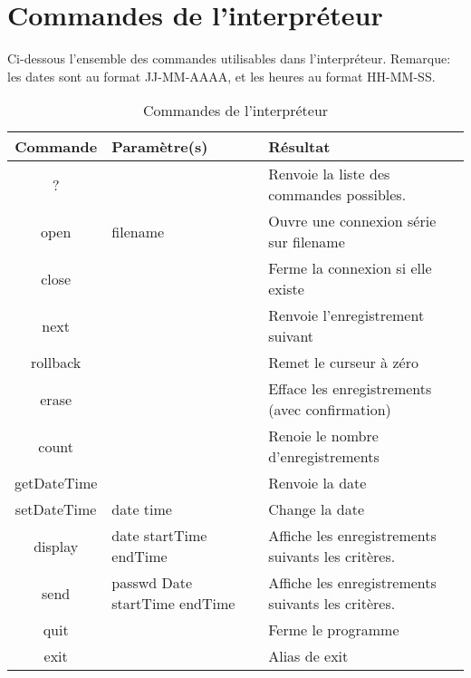 \chapter{Commandes de l'interpréteur}

    Ci-dessous l'ensemble des commandes utilisables dans l'interpréteur. Remarque:
les dates sont au format JJ-MM-AAAA, et les heures au format HH-MM-SS.

\begin{table}[h]
\begin{center}

    \renewcommand{\arraystretch}{1.2}

    \begin{tabular}{|c|M{2.5cm}|M{6cm}|}
    \hline
    Commande & Paramètre(s) & Résultat \tabularnewline
    \hline
    ? &  & Renvoie la liste des commandes possibles. \tabularnewline
    \hline
    open & filename & Ouvre une connexion série sur filename \tabularnewline
    \hline
    close &  & Ferme la connexion si elle existe \tabularnewline
    \hline
    next &  &  Renvoie l'enregistrement suivant \tabularnewline
    \hline
    rollback &  & Remet le curseur à zéro \tabularnewline
    \hline
    erase &  & Efface les enregistrements (avec confirmation) \tabularnewline
    \hline
    count &  & Renoie le nombre d'enregistrements \tabularnewline
    \hline
    getDateTime &  & Renvoie la date \tabularnewline
    \hline
    setDateTime & date time & Change la date \tabularnewline
    \hline
    display & date startTime endTime & Affiche les enregistrements suivants les critères. \tabularnewline
    \hline
    send & passwd Date startTime endTime & Affiche les enregistrements suivants les critères. \tabularnewline
    \hline
    quit &  & Ferme le programme \tabularnewline
    \hline
    exit &  & Alias de exit \tabularnewline
    \hline
    \end{tabular}

\end{center}
\caption{Commandes de l'interpréteur}
\label{Commandes de l'interpréteur}
\end{table}

